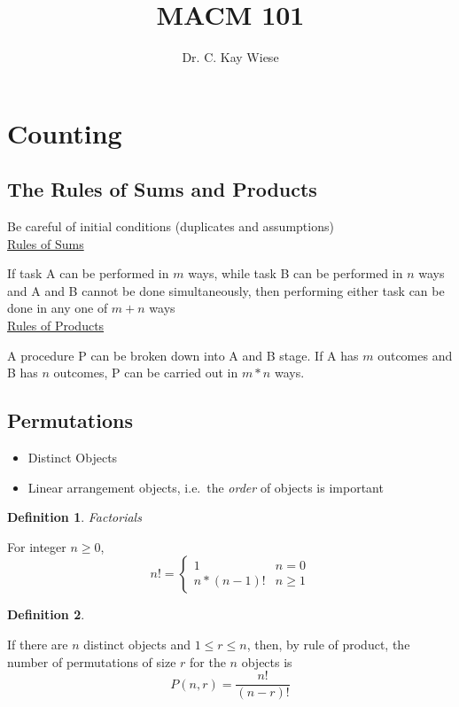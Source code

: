 \documentclass[12pt]{article}
\title{MACM 101}
\author{Dr. C. Kay Wiese}
\date{}
\newtheorem{definition}{Definition} [section]
\begin{document}
\maketitle

\section{Counting}

\subsection{The Rules of Sums and Products}

Be careful of initial conditions (duplicates and assumptions)
\\
\underline{Rules of Sums}

If task A can be performed in $m$ ways, while task B can be performed in $n$ ways and A and B cannot be done simultaneously, then performing either task can be done in any one of $m+n$ ways
\\
\underline{Rules of Products}

A procedure P can be broken down into A and B stage. If A has $m$ outcomes and B has $n$ outcomes, P can be carried out in $m * n$ ways.
\subsection{Permutations}
\begin{itemize}
\item Distinct Objects
\item Linear arrangement objects, i.e.\ the \emph{order} of objects is important
\end{itemize}
\begin{definition}Factorials\end{definition} For integer $n \geq 0$,
\[
n!=\begin{cases} 1 & n=0 \\ n*(n-1)!&n\geq1\end{cases}
\]
\begin{definition}\end{definition} \noindent If there are $n$ distinct objects and $ 1 \leq r \leq n $, then, by rule of product, the number of permutations of size $r$ for the $n$ objects is
\[
P(n, r) = \frac{n!}{(n-r)!}
\]
\end{document}
